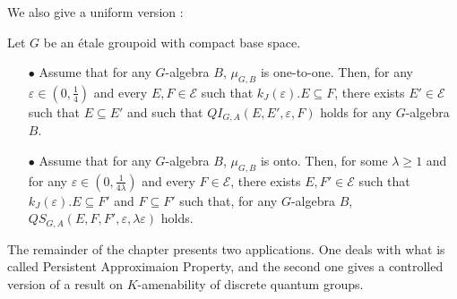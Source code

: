 We also give a uniform version :
\begin{thm} Let $G$ be an étale groupoid with compact base space. 
\begin{itemize}
\item[$\bullet$] Assume that for any $G$-algebra $B$, $\mu_{G,B}$ is one-to-one. Then, for any $\varepsilon\in (0,\frac{1}{4})$ and every $E,F\in\mathcal E$ such that $k_J(\varepsilon). E\subseteq F$, there exists $E'\in\mathcal E$ such that $E\subseteq E'$ and such that $QI_{G,A}(E,E',\varepsilon,F)$ holds for any $G$-algebra $B$.
\item[$\bullet$] Assume that for any $G$-algebra $B$, $\mu_{G,B}$ is onto. Then, for some $\lambda \geq 1$ and for any $\varepsilon\in (0,\frac{1}{4\lambda})$ and every $F\in\mathcal E$, there exists $E,F'\in\mathcal E$ such that $k_J(\varepsilon). E\subseteq F'$ and $F\subseteq F'$ such that, for any $G$-algebra $B$, $QS_{G,A}(E, F,F',\varepsilon,\lambda \varepsilon)$ holds.
\end{itemize}
\end{thm}

The remainder of the chapter presents two applications. One deals with what is called Persistent Approximaion Property, and the second one gives a controlled version of a result on $K$-amenability of discrete quantum groups. \\

